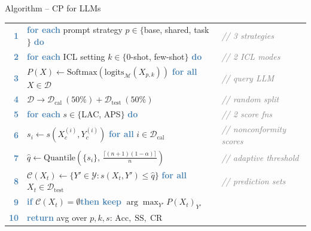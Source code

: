 \documentclass{beamer}
\newcommand{\pckw}[1]{\textcolor{steelblue}{\textbf{#1}}}
\newcommand{\pccomment}[1]{\textcolor{gray}{\textit{// #1}}}
\begin{document}
\begin{frame}{Algorithm -- CP for LLMs}

\begin{tcolorbox}[
  enhanced, skin=bicolor,
  colback=codebg, colbacklower=codebg!60,
  colframe=steelblue!60, arc=3pt,
  boxrule=0.6pt, left=4pt, right=4pt, top=3pt, bottom=3pt,
  title={\scriptsize\textbf{Algorithm 1:} Conformal Prediction for LLMs
         \hfill\textcolor{white!70}{\scriptsize
           \textbf{Input:} $\mathcal{M},\,\mathcal{D},\,\alpha$
           \quad\textbf{Output:} Acc,\,SS,\,CR}},
  fonttitle=\small\bfseries\color{white},
  coltitle=white, attach boxed title to top left,
  boxed title style={colback=steelblue!80, arc=2pt, boxrule=0pt,
                     left=4pt, right=4pt}
]
\scriptsize
\renewcommand{\arraystretch}{1.25}
\begin{tabular}{@{\,}r@{\;\;}l@{\quad}l@{}}
  \textcolor{steelblue}{\textbf{1}} &
    \pckw{for each} prompt strategy $p \in \{$base, shared, task$\}$ \pckw{do} &
    \pccomment{3 strategies} \\
  \textcolor{steelblue}{\textbf{2}} &
    \quad\pckw{for each} ICL setting $k \in \{$0-shot, few-shot$\}$ \pckw{do} &
    \pccomment{2 ICL modes} \\
  \textcolor{steelblue}{\textbf{3}} &
    \quad\quad $P(X)\leftarrow\mathrm{Softmax}(\mathrm{logits}_{\mathcal{M}}(X_{p,k}))$\; \pckw{for all} $X\in\mathcal{D}$ &
    \pccomment{query LLM} \\
  \textcolor{steelblue}{\textbf{4}} &
    \quad\quad $\mathcal{D}\to\mathcal{D}_{\mathrm{cal}}\ (50\%)+\mathcal{D}_{\mathrm{test}}\ (50\%)$ &
    \pccomment{random split} \\
  \textcolor{steelblue}{\textbf{5}} &
    \quad\quad \pckw{for each} $s \in \{$LAC, APS$\}$ \pckw{do} &
    \pccomment{2 score fns} \\
  \textcolor{steelblue}{\textbf{6}} &
    \quad\quad\quad $s_i \leftarrow s(X_c^{(i)}, Y_c^{(i)})$\; \pckw{for all} $i\in\mathcal{D}_{\mathrm{cal}}$ &
    \pccomment{nonconformity scores} \\
  \textcolor{steelblue}{\textbf{7}} &
    \quad\quad\quad $\hat{q}\leftarrow\mathrm{Quantile}\!\left(\{s_i\},\,\tfrac{\lceil(n+1)(1-\alpha)\rceil}{n}\right)$ &
    \pccomment{adaptive threshold} \\
  \textcolor{steelblue}{\textbf{8}} &
    \quad\quad\quad $\mathcal{C}(X_t)\leftarrow\{Y'\in\mathcal{Y}:s(X_t,Y')\leq\hat{q}\}$\; \pckw{for all} $X_t\in\mathcal{D}_{\mathrm{test}}$ &
    \pccomment{prediction sets} \\
  \textcolor{steelblue}{\textbf{9}} &
    \quad\quad\quad \pckw{if} $\mathcal{C}(X_t)=\emptyset$\;\pckw{then keep} $\arg\max_{Y'}P(X_t)_{Y'}$ & \\[2pt]
  \textcolor{steelblue}{\textbf{10}} &
    \pckw{return} avg over $p,k,s$:\;
    $\mathrm{Acc},\;\mathrm{SS},\;\mathrm{CR}$ &
\end{tabular}
\end{tcolorbox}

\end{frame}
\end{document}
